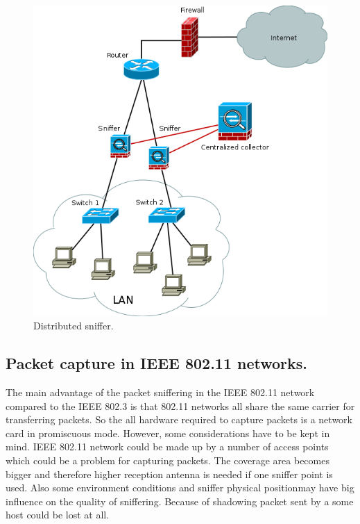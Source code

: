 \documentclass[thesis=M,english]{FITthesis}[2011/07/15]
\begin{document}
\begin{itemize}
\begin{figure}[h]
\centering
\includegraphics[scale=0.6]{images/distributed_sniffering.png}
\caption{Distributed sniffer.}
\label{fig:distributed_sniffering}
\end{figure}
\end{itemize}
\subsection{Packet capture in IEEE 802.11 networks.}
The main advantage of the packet sniffering in the IEEE 802.11 network compared to the IEEE 802.3 is that 802.11 networks all share the same carrier for transferring packets. So the all hardware required to capture packets is a network card in promiscuous mode. However, some considerations have to be kept in mind. IEEE 802.11 network could be made up by a number of access points which could be a problem for capturing packets. The coverage area becomes bigger and therefore higher reception antenna is needed if one sniffer point is used. Also some environment conditions and sniffer physical positionmay have big influence on the quality of sniffering. Because of shadowing packet sent by a some host could be lost at all.
\end{document}
